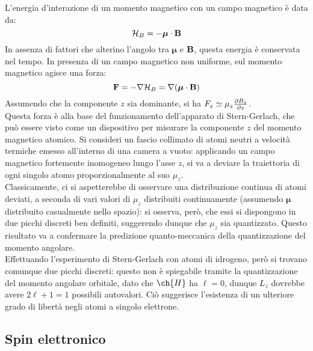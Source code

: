 L'energia d'interazione di un momento magnetico con un campo magnetico è data da:
\begin{equation}
	\mathcal{H}_B = - \boldsymbol{\mu} \cdot \mathbf{B}
	\label{eq:ham-mag-int}
\end{equation}
In assenza di fattori che alterino l'angolo tra $ \boldsymbol{\mu} $ e $ \mathbf{B} $, questa energia è conservata nel tempo. In presenza di un campo magnetico non uniforme, sul momento magnetico agisce una forza:
\begin{equation*}
	\mathbf{F} = - \nabla \mathcal{H}_B = \nabla (\boldsymbol{\mu} \cdot \mathbf{B})
\end{equation*}
Assumendo che la componente $ z $ sia dominante, si ha $ F_z \simeq \mu_z \frac{\partial B_z}{\partial z} $.\\
Questa forza è alla base del funzionamento dell'apparato di Stern-Gerlach, che può essere visto come un dispositivo per misurare la componente $ z $ del momento magnetico atomico. Si consideri un fascio collimato di atomi neutri a velocità termiche emesso all'interno di una camera a vuoto: applicando un campo magnetico fortemente inomogeneo lungo l'asse $ z $, si va a deviare la traiettoria di ogni singolo atomo proporzionalmente al suo $ \mu_z $.\\
Classicamente, ci si aspetterebbe di osservare una distribuzione continua di atomi deviati, a seconda di vari valori di $ \mu_z $ distribuiti continuamente (assumendo $ \boldsymbol{\mu} $ distribuito casualmente nello spazio): si osserva, però, che essi si dispongono in due picchi discreti ben definiti, suggerendo dunque che $ \mu_z $ sia quantizzato. Questo risultato va a confermare la predizione quanto-meccanica della quantizzazione del momento angolare.\\
Effettuando l'esperimento di Stern-Gerlach con atomi di idrogeno, però si trovano comunque due picchi discreti: questo non è spiegabile tramite la quantizzazione del momento angolare orbitale, dato che $ \ch{H} $ ha $ \ell = 0 $, dunque $ L_z $ dovrebbe avere $ 2\ell + 1 = 1 $ possibili autovalori. Ciò suggerisce l'esistenza di un ulteriore grado di libertà negli atomi a singolo elettrone.

\subsection{Spin elettronico}

